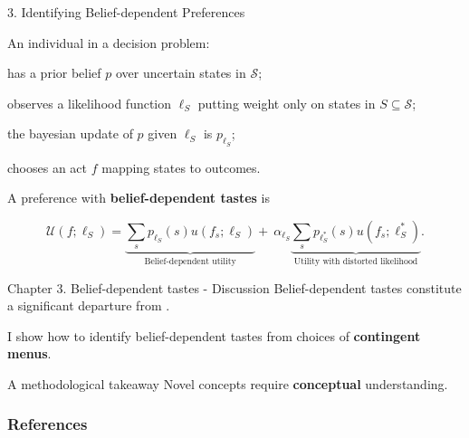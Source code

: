 \documentclass[usenames,dvipsnames,aspectratio=169,11pt,handout]{beamer}
\begin{document}
\begin{frame}{3. Identifying Belief-dependent Preferences}

	An individual in a decision problem:

	\vfill

	\begin{wideitemize}
		\item has a prior belief \( p \) over uncertain states in \( \mathcal{S} \);
		\item observes a likelihood function \( \ell_S \) putting weight only on states in \( S \subseteq \mathcal{S} \);
		\item the bayesian update of \( p \) given \( \ell_S \) is \( p_{\ell_S} \);
		\item chooses an act \( f \) mapping states to outcomes.
	\end{wideitemize}

	\vfill

	A preference with \textbf{belief-dependent tastes} is
	\vfill

	\[
		\mathcal{U}(f ; \ell_S)= \underbrace{\sum_s p_{\ell_S}(s) u\left(f_s ; \ell_S \right)}_{\text{Belief-dependent utility}} + \: \alpha_{\ell_S} \underbrace{\sum_s p_{\ell^{*}_{S}} (s) u\left(f_s ; \ell^{*}_{S} \right)}_{\text{Utility with distorted likelihood}}.
	\]


\end{frame}

\begin{frame}{Chapter 3. Belief-dependent tastes - Discussion}
	Belief-dependent tastes constitute a significant departure from \cite{savageFoundationsStatistics1972}.

	\vfill

	I show how to identify belief-dependent tastes from choices of \textbf{contingent menus}.
\end{frame}

\begin{frame}{A methodological takeaway}
	Novel concepts require \textbf{conceptual} understanding.
\end{frame}

\begin{frame}

	\frametitle{References}

	
	


\end{frame}
\end{document}
